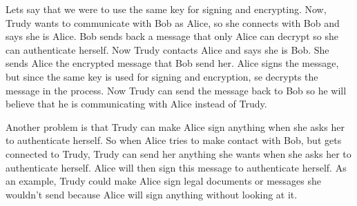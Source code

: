 Lets say that we were to use the same key for signing and encrypting. Now, Trudy wants to communicate with Bob as Alice, so she connects with Bob and says she is Alice. Bob sends back a message that only Alice can decrypt so she can authenticate herself. Now Trudy contacts Alice and says she is Bob. She sends Alice the encrypted message that Bob send her. Alice signs the message, but since the same key is used for signing and encryption, se decrypts the message in the process. Now Trudy can send the message back to Bob so he will believe that he is communicating with Alice instead of Trudy. 

Another problem is that Trudy can make Alice sign anything when she asks her to authenticate herself. So when Alice tries to make contact with Bob, but gets connected to Trudy, Trudy can send her anything she wants when she asks her to authenticate herself. Alice will then sign this message to authenticate herself. As an example, Trudy could make Alice sign legal documents or messages she wouldn't send because Alice will sign anything without looking at it.
